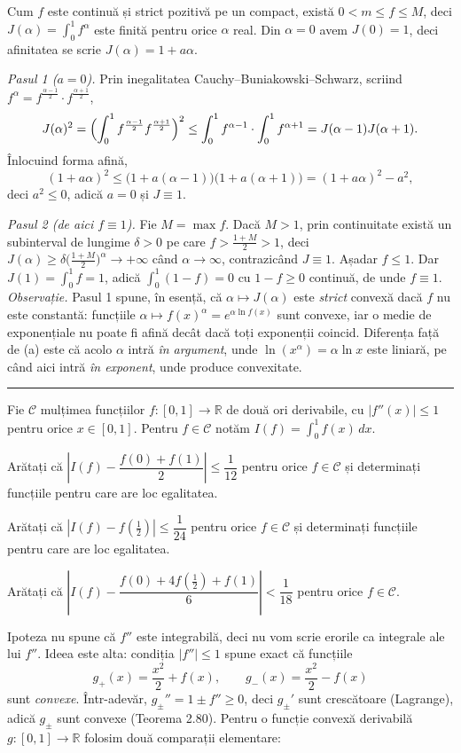 Cum $f$ este continuă și strict pozitivă pe un compact, există $0<m\le f\le M$,
deci $J(\alpha)=\int_0^{1}f^{\alpha}$ este finită pentru orice $\alpha$ real. Din
$\alpha=0$ avem $J(0)=1$, deci afinitatea se scrie $J(\alpha)=1+a\alpha$.

\noindent\textit{Pasul 1 ($a=0$).} Prin inegalitatea Cauchy--Buniakowski--Schwarz,
scriind $f^{\alpha}=f^{\frac{\alpha-1}{2}}\cdot f^{\frac{\alpha+1}{2}}$,
\[ J(\alpha)^2=\Bigl(\int_0^{1}f^{\frac{\alpha-1}{2}}f^{\frac{\alpha+1}{2}}\Bigr)^{2}
   \le\int_0^{1}f^{\alpha-1}\cdot\int_0^{1}f^{\alpha+1}=J(\alpha-1)J(\alpha+1). \]
Înlocuind forma afină,
\[ (1+a\alpha)^2\le\bigl(1+a(\alpha-1)\bigr)\bigl(1+a(\alpha+1)\bigr)=(1+a\alpha)^2-a^2, \]
deci $a^2\le0$, adică $a=0$ și $J\equiv1$.

\noindent\textit{Pasul 2 (de aici $f\equiv1$).} Fie $M=\max f$. Dacă $M>1$, prin
continuitate există un subinterval de lungime $\delta>0$ pe care
$f>\frac{1+M}{2}>1$, deci
$J(\alpha)\ge\delta\bigl(\frac{1+M}{2}\bigr)^{\alpha}\to+\infty$ când
$\alpha\to\infty$, contrazicând $J\equiv1$. Așadar $f\le1$. Dar
$J(1)=\int_0^{1}f=1$, adică $\int_0^{1}(1-f)=0$ cu $1-f\ge0$ continuă, de unde
$f\equiv1$.\\[2pt]
\emph{Observație.} Pasul 1 spune, în esență, că $\alpha\mapsto J(\alpha)$ este
\emph{strict} convexă dacă $f$ nu este constantă: funcțiile $\alpha\mapsto
f(x)^{\alpha}=e^{\alpha\ln f(x)}$ sunt convexe, iar o medie de exponențiale nu
poate fi afină decât dacă toți exponenții coincid. Diferența față de (a) este că
acolo $\alpha$ intră \emph{în argument}, unde $\ln(x^{\alpha})=\alpha\ln x$ este
liniară, pe când aici intră \emph{în exponent}, unde produce convexitate.
\vspace{1mm}\hrule

Fie $\mathcal{C}$ mulțimea funcțiilor $f:[0,1]\to\mathbb{R}$ de două ori derivabile, cu
$|f''(x)|\le1$ pentru orice $x\in[0,1]$. Pentru $f\in\mathcal{C}$ notăm
$I(f)=\displaystyle\int_0^1 f(x)\,dx$.
\begin{parti}
  \item Arătați că $\left|I(f)-\dfrac{f(0)+f(1)}{2}\right|\le\dfrac1{12}$ pentru orice
        $f\in\mathcal{C}$ și determinați funcțiile pentru care are loc egalitatea.
  \item Arătați că $\left|I(f)-f\!\left(\tfrac12\right)\right|\le\dfrac1{24}$ pentru orice
        $f\in\mathcal{C}$ și determinați funcțiile pentru care are loc egalitatea.
  \item Arătați că
        $\left|I(f)-\dfrac{f(0)+4f\left(\frac12\right)+f(1)}{6}\right|<\dfrac1{18}$
        pentru orice $f\in\mathcal{C}$.
\end{parti}
\sol Ipoteza nu spune că $f''$ este integrabilă, deci nu vom scrie erorile ca integrale ale lui $f''$. Ideea este alta: condiția $|f''|\le1$ spune exact că funcțiile
\[ g_{+}(x)=\frac{x^{2}}{2}+f(x),\qquad g_{-}(x)=\frac{x^{2}}{2}-f(x) \]
sunt \emph{convexe}. Într-adevăr, $g_{\pm}''=1\pm f''\ge0$, deci $g_{\pm}'$ sunt crescătoare (Lagrange), adică $g_{\pm}$ sunt convexe (Teorema 2.80). Pentru o funcție convexă derivabilă $g:[0,1]\to\mathbb{R}$ folosim două comparații elementare:

